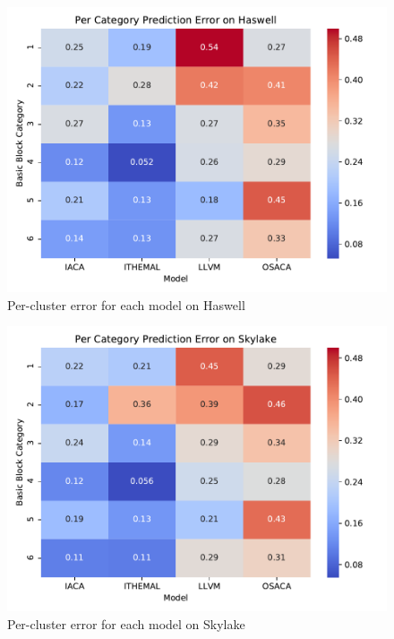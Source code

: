 \begin{figure}
\includegraphics[width=\columnwidth]{figures/hsw-cluster-err.pdf}
\caption{Per-cluster error for each model on Haswell}
\label{fig:hsw-cluster-err}
\end{figure}

\begin{figure}
\includegraphics[width=\columnwidth]{figures/skl-cluster-err.pdf}
\caption{Per-cluster error for each model on Skylake}
\label{fig:skl-cluster-err}
\end{figure} 

